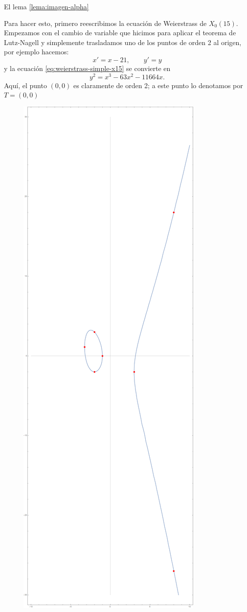 \documentclass[../../tesis_maestria]{subfiles}
\begin{document}
El lema \ref{lema:imagen-alpha}


Para hacer esto, primero reescribimos la ecuación de Weierstrass de $X_0(15)$. Empezamos con el cambio de variable que hicimos para aplicar el teorema de Lutz-Nagell y simplemente trasladamos uno de los puntos de orden 2 al origen, por ejemplo hacemos:
\[
	x'=x-21,\qquad y'=y
\]
y la ecuación \ref{eq:weierstrass-simple-x15} se convierte en
\[
	y^2=x^3-63x^2-11664x.
\]
Aquí, el punto $(0,0)$ es claramente de orden 2; a este punto lo denotamos por $T=(0,0)$






\begin{figure}[!h]%
  \centering
  \includegraphics[scale=0.2]{figuras/pts_racionales_x15}

\end{figure}
\end{document}

